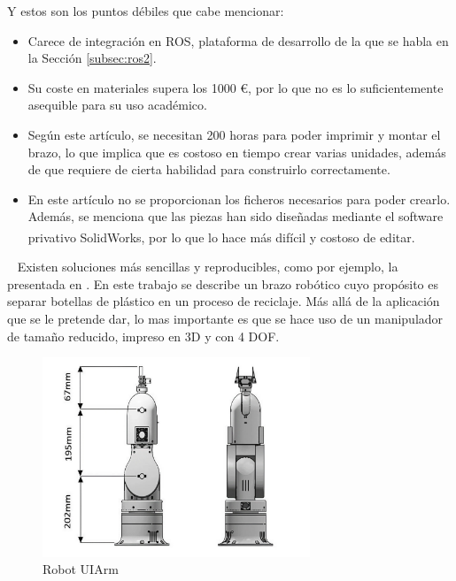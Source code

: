     Y estos son los puntos débiles que cabe mencionar:
    \begin{itemize}
        \item Carece de integración en \ac{ROS}, plataforma de desarrollo de la que se habla en la Sección \ref{subsec:ros2}.
        \item Su coste en materiales supera los 1000 \euro \xspace , por lo que no es lo suficientemente asequible para su uso académico.
        \item Según este artículo, se necesitan 200 horas para poder imprimir y montar el brazo, lo que implica que es costoso en tiempo 
        crear varias unidades, además de que requiere de cierta habilidad para construirlo correctamente.
        \item En este artículo no se proporcionan los ficheros necesarios para poder crearlo. Además, se menciona que las piezas han sido 
        diseñadas mediante el software privativo SolidWorks\textsuperscript{\tiny\textregistered}, por lo que lo hace más difícil y costoso de editar.
    \end{itemize}\
    \newpage
    Existen soluciones más sencillas y reproducibles, como por ejemplo, la presentada en \cite{adediran2023uiarm}. En este trabajo se describe 
    un brazo robótico 
    cuyo propósito es separar botellas de plástico en un proceso de reciclaje. Más allá de la aplicación que se le pretende dar, 
    lo mas importante es que se hace uso de  
    un manipulador de tamaño reducido, impreso en 3D y con 4 \ac{DOF}.
    \begin{figure} [ht!]
        \begin{center}
          \includegraphics[width=8cm]{figs/uiarm.png}
        \end{center}
        \caption{Robot UIArm}
        \label{fig:uiarm}
    \end{figure}\ 
    
